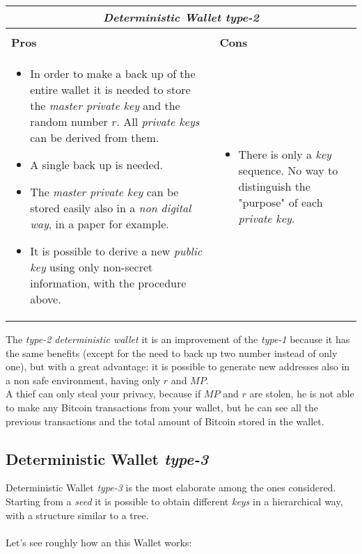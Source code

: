 \begin{center}
	\begin{tabular}{ |p{6cm}|p{6cm}|  }
		\hline
		\multicolumn{2}{|c|}{\textbf{\textit{Deterministic Wallet type-2}}} \\
		\hline \hline 
		\\
		\centerline{\textbf{Pros}}&\centerline{\textbf{Cons}}\\
		\hline
		\begin{itemize}
			\item In order to make a back up of the entire wallet it is needed to store the \textit{master private key} and the random number $r$. All \textit{private keys} can be derived from them.
			\item A single back up is needed.
			\item The \textit{master private key} can be stored easily also in a \textit{non digital way}, in a paper for example.
			\item It is possible to derive a new \textit{public key} using only non-secret information, with the procedure above.
		\end{itemize} &
		\begin{itemize}
			\item There is only a \textit{key} sequence. No way to distinguish the "purpose" of each \textit{private key}.
		\end{itemize}\\
		\hline
	\end{tabular}
\end{center}
The \textit{type-2 deterministic wallet} it is an improvement of the \textit{type-1} because it has the same benefits (except for the need to back up two number instead of only one), but with a great advantage: it is possible to generate new addresses also in a non safe environment, having only $r$ and $MP$. \\
A thief can only steal your privacy, because if $MP$ and $r$ are stolen, he is not able to make any Bitcoin transactions from your wallet, but he can see all the previous transactions and the total amount of Bitcoin stored in the wallet.

\subsection{Deterministic Wallet \textit{type-3}}
Deterministic Wallet \textit{type-3} is the most elaborate among the ones considered. Starting from a \textit{seed} it is possible to obtain different \textit{keys} in a hierarchical way, with a structure similar to a tree. \\ \\
Let's see roughly how an this Wallet works:

